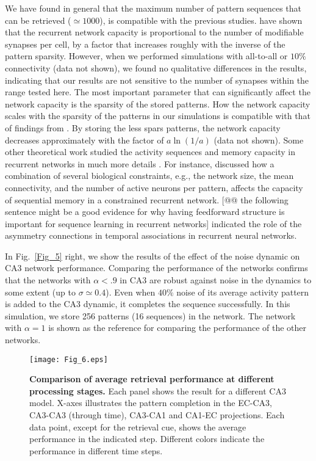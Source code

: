 \documentclass[utf8]{frontiersSCNS} %
\begin{document}
We have found in general that the maximum number of pattern sequences that can be retrieved ($\simeq 1000$), is compatible with the previous studies. \citet{treves1994computational} have shown that the recurrent network capacity is proportional to the number of modifiable synapses per cell, by a factor that increases roughly with the inverse of the pattern sparsity. 
%
However, when we performed simulations with all-to-all or $10 \%$ connectivity (data not shown), we found no qualitative differences in the results, indicating that our results are not sensitive to the number of synapses within the range tested here.
%
The most important parameter that can significantly affect the network capacity is the sparsity of the stored patterns. How the network capacity scales with the sparsity of the patterns in our simulations is compatible with that of findings from \citet{treves1994computational}. By storing the less spars patterns, the network capacity decreases approximately with the factor of $a \ln (1/a)$ (data not shown).   
%
Some other theoretical work studied the activity sequences and memory capacity in recurrent networks in much more details \citep{leibold2006memory, sompolinsky1986temporal}.
%
For instance, \citep{leibold2006memory} discussed how a combination of several biological constraints, e.g., the network size, the mean connectivity, and the number of active neurons per pattern, affects the capacity of sequential memory in a constrained recurrent network. 
%
[@@ the following sentence might be a good evidence for why having feedforward structure is important for sequence learning in recurrent networks] \citet{sompolinsky1986temporal} indicated the role of the asymmetry connections in temporal associations in recurrent neural networks. 


In Fig.~\ref{Fig_5} right, we show the results of the effect of the noise dynamic on CA3 network performance. 
Comparing the performance of the networks confirms that the networks with $\alpha < .9$ in CA3 are robust against noise in the dynamics to some extent (up to $\sigma \simeq 0.4$). Even when $ 40 \% $ noise of its average activity pattern is added to the CA3 dynamic, it completes the sequence successfully. 
%
In this simulation, we store 256 patterns (16 sequences) in the network. The network with $\alpha = 1$ is shown as the reference for comparing the performance of the other networks.    
 

\begin{figure}[!htb]
\centering\texttt{[image: Fig\_6.eps]}
\caption{\textbf{Comparison of average retrieval performance at different processing stages.}
Each panel shows the result for a different CA3 model. X-axes illustrates the pattern completion in the EC-CA3, CA3-CA3 (through time), CA3-CA1 and CA1-EC projections. Each data point, except for the retrieval cue, shows the average performance in the indicated step. Different colors indicate the performance in different time steps.}
\label{Fig_6}
\end{figure}
\end{document}

